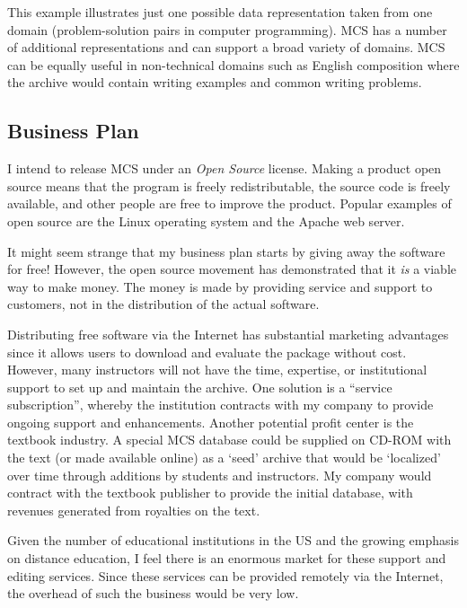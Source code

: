 This example illustrates just one possible data representation taken from one
domain (problem-solution pairs in computer programming). MCS has a number of
additional representations and can support a broad variety of domains. MCS can
be equally useful in non-technical domains such as English composition where
the archive would contain writing examples and common writing problems.

\subsection{Business Plan}
I intend to release MCS under an {\em Open Source} license. Making a product
open source means that the program is freely redistributable, the source code
is freely available, and other people are free to improve the product. Popular
examples of open source are the Linux operating system and the Apache web
server.

It might seem strange that my business plan starts by giving away the software
for free! However, the open source movement has demonstrated that it {\em is} a
viable way to make money. The money is made by providing service and support to
customers, not in the distribution of the actual software.

Distributing free software via the Internet has substantial marketing
advantages since it allows users to download and evaluate the package without
cost.  However, many instructors will not have the time, expertise, or
institutional support to set up and maintain the archive. One solution is a
``service subscription'', whereby the institution contracts with my company to
provide ongoing support and enhancements. Another potential profit center is
the textbook industry. A special MCS database could be supplied on CD-ROM with
the text (or made available online) as a `seed' archive that would be
`localized' over time through additions by students and instructors. My company
would contract with the textbook publisher to provide the initial database,
with revenues generated from royalties on the text.

Given the number of educational institutions in the US and the growing emphasis
on distance education, I feel there is an enormous market for these support and
editing services. Since these services can be provided remotely via the Internet,
the overhead of such the business would be very low.

